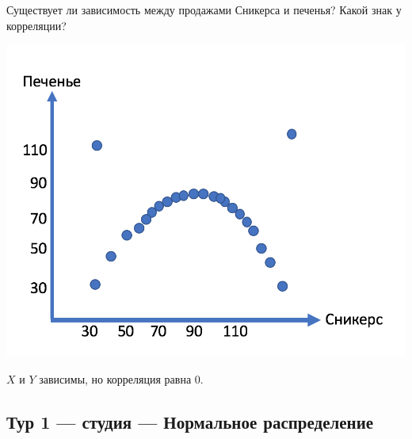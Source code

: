 \documentclass[12pt]{article}
\newenvironment{problem}{}{}
\newenvironment{sol}{}{} %
\begin{document}
\begin{enumerate}
\begin{problem}
Существует ли зависимость между продажами Сникерса и печенья? Какой знак у корреляции? 

\includegraphics[scale=0.5]{No_correlation}

\begin{sol}
$X$ и $Y$ зависимы, но корреляция равна $0$.
\end{sol}
\end{problem}
\end{enumerate}


\newpage
\subsection{Тур 1 — студия — Нормальное распределение}
\end{document}
